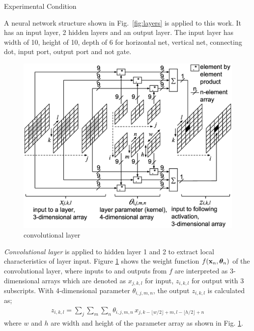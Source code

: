 \documentclass[twocolumn]{article}
\makeatletter
\def\section{\@startsection {section}{1}{\z@}{20pt plus 2pt minus 2pt}
{8pt plus 2pt minus 2pt}{\centering\normalsize\sc
\edef\@svsec{\thesection.\ }}}
\def\thesection{\Roman{section}}
\makeatother
\begin{document}
\section{Experimental Condition}

A neural network structure shown in Fig.\ \ref{fig:layers} is
applied to this work.
It has an input layer, 2 hidden layers and an output layer.
The input layer has width of 10, height of 10,
depth of 6 for horizontal net, vertical net, connecting dot, input port,
output port and not gate.

\begin{figure}[!tb]
 \begin{center}
  \begin{minipage}{\hsize}
   \includegraphics[width=\hsize]{fig/layer_convolutional_03.eps}
   \caption{convolutional layer}
   \label{fig:layer_convolutional}
  \end{minipage}
 \end{center}
\end{figure}

{\it Convolutional layer} is applied to hidden layer 1 and 2
to extract local characteristics of layer input\cite{mit}.
Figure \ref{fig:layer_convolutional} shows the weight function
$f({\bf x}_n, {\bm \theta}_n)$ of the convolutional layer,
where inputs to and outputs from $f$ are interpreted as
3-dimensional arrays which are denoted as $x_{j,k,l}$ for input,
$z_{i,k,l}$ for output with 3 subscripts.
With 4-dimensional parameter $\theta_{i,j,m,n}$,
the output $z_{i,k,l}$ is calculated as;
\begin{eqnarray}
z_{i,k,l} = \sum_{j}\sum_{m}\sum_{n}
\theta_{i,j,m,n}\,
 x_{j,k - \lfloor w/2 \rfloor + m,l - \lfloor h/2 \rfloor + n}
\end{eqnarray}
where $w$ and $h$ are width and height of the parameter array
as shown in Fig. \ref{fig:layer_convolutional}.
\end{document}
